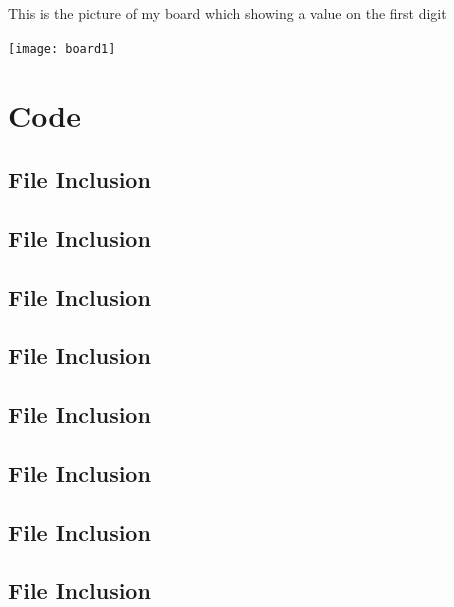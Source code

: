 \documentclass[11pt]{article}
\newcommand{\Verilog}[2][]{%
	
}
\begin{document}
This is the picture of my board which showing a value on the first digit\\
\begin{center}
	\texttt{[image: board1]}
\end{center}


\section*{Code}

\subsection*{File Inclusion}
\Verilog[caption=mux2 Verilog code,label=code:file_ex]{mux2.sv}

\subsection*{File Inclusion}
\Verilog[caption=mux2 Test Benches Verilog code,label=code:file_ex]{mux2_test.sv}


\subsection*{File Inclusion}
\Verilog[caption=mux4 Verilog code,label=code:file_ex]{mux4.sv}

\subsection*{File Inclusion}
\Verilog[caption=mux4 Test Benches Verilog code,label=code:file_ex]{mux4_test.sv}


\subsection*{File Inclusion}
\Verilog[caption=anode decoder Verilog code,label=code:file_ex]{anode_decoder.sv}

\subsection*{File Inclusion}
\Verilog[caption=anode decoder Test Benches Verilog code,label=code:file_ex]{anode_decoder_test.sv}


\subsection*{File Inclusion}
\Verilog[caption=sseg4 Verilog code,label=code:file_ex]{sseg4.sv}

\subsection*{File Inclusion}
\Verilog[caption=sseg4 manual Verilog code,label=code:file_ex]{sseg4_manual.sv}
\end{document}
